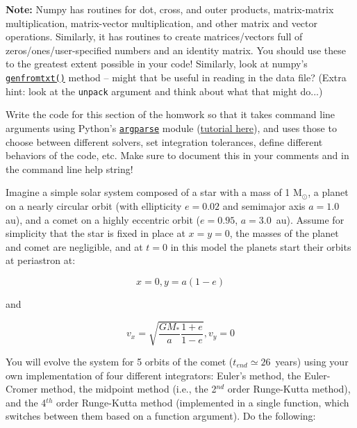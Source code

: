 \documentclass[10pt]{article}
\begin{document}
\noindent \textbf{Note:} Numpy has routines for dot, cross, and outer products,
matrix-matrix multiplication, matrix-vector multiplication, and other
matrix and vector operations.  Similarly, it has routines to create
matrices/vectors full of zeros/ones/user-specified numbers and an
identity matrix.  You should use these to the greatest
extent possible in your code!  Similarly, look at numpy's
\href{https://numpy.org/doc/stable/reference/generated/numpy.genfromtxt.html}{\texttt{genfromtxt()}}
method -- might that be useful in reading in the data file?  (Extra
hint: look at the \texttt{unpack} argument and think about what that
might do...) 


\vspace{5mm}
\noindent\makebox[\linewidth]{\rule{0.76\paperwidth}{0.4pt}}
\vspace{2mm}


  Write the code for this section of
the homwork so that it takes command line arguments using Python's
\href{https://docs.python.org/3/library/argparse.html}{\texttt{argparse}}
module
(\href{https://docs.python.org/3/howto/argparse.html#id1}{tutorial
here}), and uses those to choose between different solvers, set
integration tolerances, define different behaviors of the code, etc.  Make sure to
document this in your comments and in the command line help string!

Imagine a simple solar system composed of a star with a mass of 1
M$_\odot$, a planet on a nearly circular orbit (with ellipticity
$e=0.02$ and semimajor axis $a=1.0$ au), and a comet on a highly
eccentric orbit ($e=0.95$, $a=3.0$~au).  Assume for simplicity that
the star is fixed in place at $x=y=0$, the masses of the planet and
comet are negligible, and at $t=0$ in this model the planets start
their orbits at periastron at:

\begin{equation}
x = 0, 
y= a(1-e)
\end{equation}

and

\begin{equation}
v_x = \sqrt{\frac{GM_*}{a} \frac{1+e}{1-e}},
 v_y = 0
\end{equation}

\noindent
You will evolve the system for 5 orbits of the comet ($t_{end} \simeq
26$~years) using your own implementation of four different
integrators: Euler's method, the Euler-Cromer method, the midpoint
method (i.e., the 2$^{nd}$ order Runge-Kutta method), and the 4$^{th}$
order Runge-Kutta method (implemented in a single function, which
switches between them based on a function argument).  Do the
following:
\end{document}
